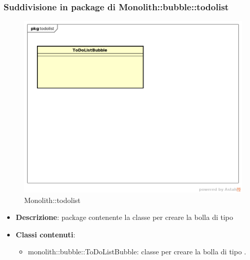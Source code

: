 \subsubsection{Suddivisione in package  di Monolith::bubble::todolist}
\label{Monolith::bubble::todolist}
\begin{figure}[H]
	\centering
	\includegraphics[scale=0.5]{Sezioni/imgPackage/bubble_todolist.png}
	\caption{Monolith::todolist}
\end{figure}
\begin{itemize}
	\item{\textbf{Descrizione}}: package contenente la classe per creare la bolla di tipo 
	\item{\textbf{Classi contenuti}}:
	\begin{itemize}
	\item{monolith::bubble::ToDoListBubble}: classe per creare la bolla di tipo .
	\end{itemize}
\end{itemize}
	
